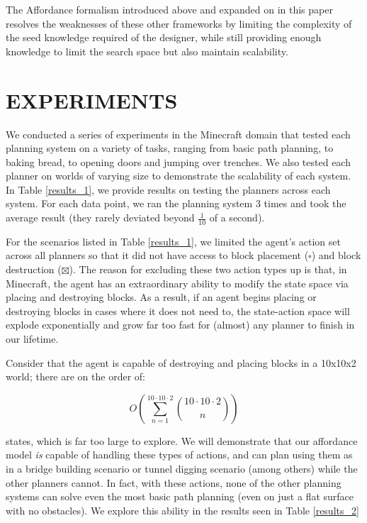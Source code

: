 \documentclass[]{article}
\begin{document}
The Affordance formalism introduced above and expanded on in this 
paper resolves the weaknesses of these other frameworks by limiting 
the complexity of the seed knowledge required of the designer, while 
still providing enough knowledge to limit the search space but also 
maintain scalability.

\section{EXPERIMENTS}

We conducted a series of experiments in the Minecraft domain that tested 
each planning system on a variety of tasks, ranging from basic path planning,
 to baking bread, to opening doors and jumping over trenches.  We also tested 
 each planner on worlds of varying size to demonstrate the scalability of each 
 system. In Table \ref{results_1}, we provide results on testing the planners 
 across each system. For each data point, we ran the planning system 3 times 
 and took the average result (they rarely deviated beyond $\frac{1}{10}$ of a second).

For the scenarios listed in Table \ref{results_1}, we limited the agent's 
action set across all planners so that it did not have access to block 
placement ($\square$) and block destruction ($\boxtimes$). The reason 
for excluding these two action types up is that, in Minecraft, the agent 
has an extraordinary ability to modify the state space via placing and 
destroying blocks. As a result, if an agent begins placing or destroying 
blocks in cases where it does not need to, the state-action space will 
explode exponentially and grow far too fast for (almost) any planner to 
finish in our lifetime. 

Consider that the agent is capable of destroying and placing blocks in a 10x10x2 world; there are on the order of:

\begin{equation}
O\left(\sum_{n=1}^{10 \cdot 10 \cdot 2} \binom{10 \cdot 10 \cdot 2}{n}\right)
\label{eq:mc_explode}
\end{equation}

states, which is far too large to explore. We will demonstrate that our 
affordance model {\it is} capable of handling these types of actions, 
and can plan using them as in a bridge building scenario or tunnel 
digging scenario (among others) while the other planners cannot. 
In fact, with these actions, none of the other planning systems 
can solve even the most basic path planning (even on just a flat 
surface with no obstacles). We explore this ability in the results 
seen in Table \ref{results_2}
\end{document}
